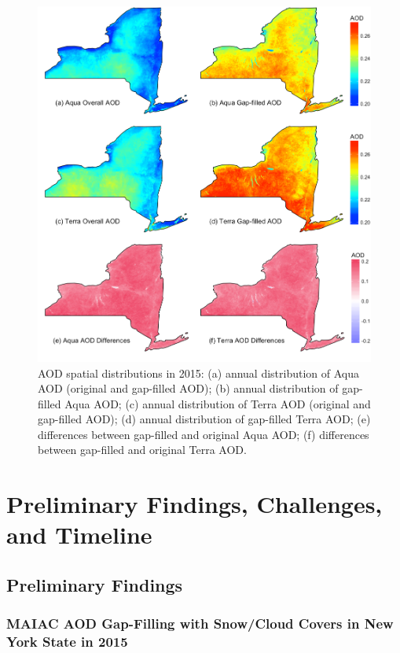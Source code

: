 \documentclass[11pt]{article}
\begin{document}
\begin{figure}[htbp]
\begin{center}
\includegraphics[width=\textwidth]{img/fig2.png}
\caption{AOD spatial distributions in 2015: (a) annual distribution of Aqua AOD (original and gap-filled AOD); (b) annual distribution of gap-filled Aqua AOD; (c) annual distribution of Terra AOD (original and gap-filled AOD); (d) annual distribution of gap-filled Terra AOD; (e) differences between gap-filled and original Aqua AOD; (f) differences between gap-filled and original Terra AOD.}
\label{fig:aod}
\end{center}
\end{figure}

\section{Preliminary Findings, Challenges, and Timeline}
\subsection{Preliminary Findings}
\subsubsection{MAIAC AOD Gap-Filling with Snow/Cloud Covers in New York State in 2015}
\end{document}
